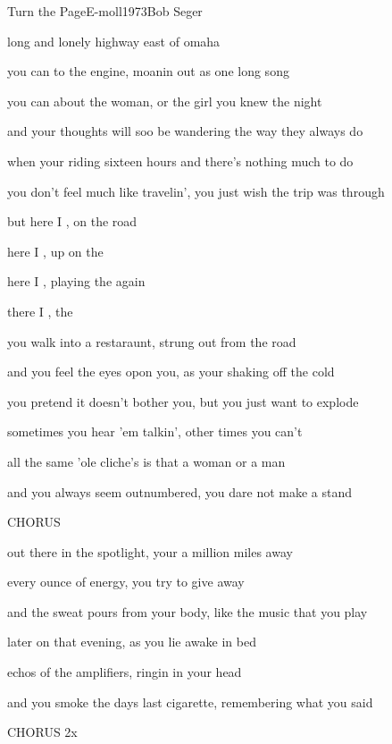 \begin{song}{Turn the Page}{E-moll}{1973}{Bob Seger}{}{}

  \begin{SBVerse}
     long and lonely highway east of omaha

    you can  to the engine, moanin out as one long song

    you can  about the woman, or the girl you knew the night 
  \end{SBVerse}
  \begin{SBVerse}
    and your thoughts will soo be wandering the way they always do

    when your riding sixteen hours and there's nothing much to do

    you don't feel much like travelin', you just wish the trip was through
  \end{SBVerse}
  \begin{SBChorus}
    but here I , on the road 

    here I , up on the 

    here I , playing the  again

    there I ,  the 
  \end{SBChorus}
  \begin{SBVerse}
    you walk into a restaraunt, strung out from the road

    and you feel the eyes opon you, as your shaking off the cold

    you pretend it doesn't bother you, but you just want to explode
  \end{SBVerse}
  \begin{SBVerse}
    sometimes you hear 'em talkin', other times you can't

    all the same 'ole cliche's is that a woman or a man

    and you always seem outnumbered, you dare not make a stand
  \end{SBVerse}
  \begin{SBChorus}
    CHORUS
  \end{SBChorus}
  \begin{SBVerse}
    out there in the spotlight, your a million miles away

    every ounce of energy, you try to give away

    and the sweat pours from your body, like the music that you play
  \end{SBVerse}
  \begin{SBVerse}
    later on that evening, as you lie awake in bed

    echos of the amplifiers, ringin in your head

    and you smoke the days last cigarette, remembering what you said
  \end{SBVerse}
  \begin{SBChorus}
    CHORUS 2x
  \end{SBChorus}
\end{song}
